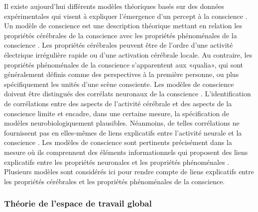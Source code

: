 Il existe aujourd'hui différents modèles théoriques basés sur des données expérimentales qui visent à expliquer l'émergence d'un percept à la conscience \citep{dehaene2011experimental, kleiner2020mathematical, sattin2021theoretical, seth2009explanatory, tagliazucchi2013sleep, taylor2011review}. 
Un modèle de conscience est une description théorique mettant en relation les propriétés cérébrales de la conscience avec les propriétés phénoménales de la conscience \citep{seth2007models}. 
Les propriétés cérébrales peuvent être de l'ordre d'une activité électrique irrégulière rapide ou d'une activation cérébrale locale. 
Au contraire, les propriétés phénoménales de la conscience s'apparentent aux «qualia», qui sont généralement définis comme des perspectives à la première personne, ou plus spécifiquement les unités d'une scène consciente. 
Les modèles de conscience doivent être distingués des corrélats neuronaux de la conscience \citep{crick1990towards}. 
L'identification de corrélations entre des aspects de l'activité cérébrale et des aspects de la conscience limite et encadre, dans une certaine mesure, la spécification de modèles neurobiologiquement plausibles. 
Néanmoins, de telles corrélations ne fournissent pas en elles-mêmes de liens explicatifs entre l'activité neurale et la conscience \citep{seth2007models}. 
Les modèles de conscience sont pertinents précisément dans la mesure où ils comprennent des éléments informationnels qui proposent des liens explicatifs entre les propriétés neuronales et les propriétés phénoménales \citep{dehaene2011experimental, kleiner2020mathematical, sattin2021theoretical, tagliazucchi2013sleep}. 
Plusieurs modèles sont considérés ici pour rendre compte de liens explicatifs entre les propriétés cérébrales et les propriétés phénoménales de la conscience. 

\subsubsection{Théorie de l'espace de travail global}
\label{theorieespacedetravailglobal}

